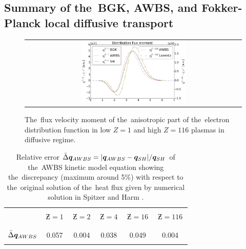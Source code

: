 
\subsection{Summary of the~BGK, AWBS, and Fokker-Planck local diffusive 
transport}
\label{sec:SummaryDiffusiveKinetics}

\begin{figure}[tbh]
  \begin{center}
    \begin{tabular}{c}
      \includegraphics[width=0.5\textwidth]{q1s.png}
    \end{tabular}
  \caption{  
  The~flux velocity moment of the~anisotropic part of the~electron distribution 
  function in low $Z=1$ and high $Z=116$ plasmas in diffusive regime.}
  \label{fig:q1s_summary}
  \end{center} 
\end{figure}

\begin{table}
\begin{center}
  \begin{tabular}{c|ccccc}
    \hline\hline\\
    & $\,\Zbar=1\,$ & $\,\Zbar=2\,$ & $\,\Zbar=4\,$ & $\,\Zbar=16\,$ & $\,\Zbar=116\,$ \\\\
    \hline\\
    $\bar{\Delta}\boldsymbol{q}_{AWBS}$ & 0.057 & 0.004 & 0.038 & 0.049 & 0.004 \\\\
    \hline\hline
  \end{tabular}
  \caption{
  Relative error $\bar{\Delta}\boldsymbol{q}_{AWBS} = 
  |\boldsymbol{q}_{AWBS} - \boldsymbol{q}_{SH}| / \boldsymbol{q}_{SH}$ of the~AWBS
  kinetic model equation  showing the~discrepancy 
  (maximum around 5$\%$) with respect to the~original solution of 
  the~heat flux given by numerical solution in Spitzer and Harm 
  \cite{SpitzerHarm_PR1953}.
  }
\label{tab:qAWBS}
\end{center}
\end{table}

